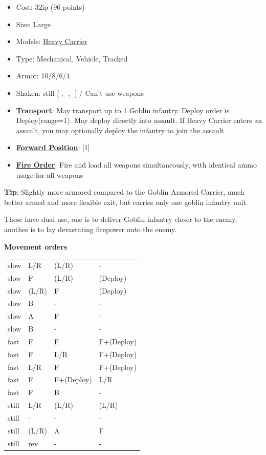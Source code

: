 \documentclass[a4paper,12pt]{article}
\begin{document}
\begin{itemize}
\item Cost: 32ip (96 points)
\item Size: Large
\item Models: \hyperref[model-heavy-carrier]{Heavy Carrier}
\item Type: Mechanical, Vehicle, Tracked
\item Armor: 10/8/6/4
\item Shaken: still [-, -, -] / Can't use weapons
\item \textbf{\hyperref[rule-special-transport]{Transport}}: May transport up to 1 Goblin infantry. Deploy order is Deploy(range=1). May deploy directly into assault. If Heavy Carrier enters an assault, you may optionally deploy the infantry to join the assault
\item \textbf{\hyperref[rule-special-forward-position]{Forward Position}}: [1]
\item \textbf{\hyperref[rule-special-fire-order]{Fire Order}}: Fire and load all weapons simultaneously, with identical ammo usage for all weapons

\end{itemize}
\noindent\textbf{Tip}: Slightly more armored compared to the Goblin Armored Carrier, much better armed and more flexible exit, but carries only one goblin infantry unit.

These have dual use, one is to deliver Goblin infantry closer to the enemy, anothes is to lay devastating firepower onto the enemy.

\noindent\textbf{Movement orders}

\begin{tabular}{llll}
slow & L/R & (L/R) & - \\
slow & F & (L/R) & (Deploy) \\
slow & (L/R) & F & (Deploy) \\
slow & B & - & - \\
slow & A & F & - \\
slow & B & - & - \\
fast & F & F & F+(Deploy) \\
fast & F & L/R & F+(Deploy) \\
fast & L/R & F & F+(Deploy) \\
fast & F & F+(Deploy) & L/R \\
fast & F & B & - \\
still & L/R & (L/R) & (L/R) \\
still & - & - & - \\
still & (L/R) & A & F \\
still & rev & - & - \\
\end{tabular}
\vspace{1ex}
\end{document}
